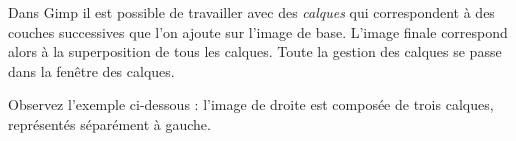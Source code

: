 Dans Gimp il est possible de travailler avec des \emph{calques} qui correspondent à des couches successives que l'on ajoute sur l'image de base. L'image finale correspond alors à la superposition de tous les calques. Toute la gestion des calques se passe dans la fenêtre des calques.

\vspace{6pt}

Observez l'exemple ci-dessous : l'image de droite est composée de trois calques, représentés séparément à gauche.

\vspace{12pt}

\begin{minipage}[c]{.22\textwidth}
\centering%
\end{minipage}\hfill%
